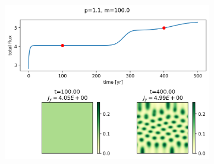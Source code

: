 \documentclass{article}
\numberwithin{equation}{section}
\begin{document}
\begin{figure}[!ht]
    \begin{subfigure}[]{0.5\textwidth}
        \centering
        \includegraphics[scale=0.5]{plots/p1_1_m100_0.png}
        \label{fig:m100_0}
    \end{subfigure}
\end{figure}
\end{document}
